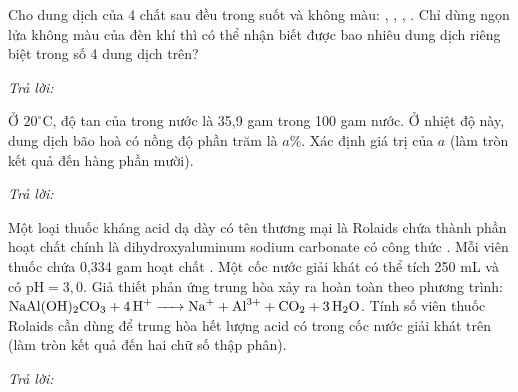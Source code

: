 \documentclass[11pt,a4paper]{article}
\def\loigiai#1{}
\begin{document}
\begin{ex}
Cho dung dịch của 4 chất sau đều trong suốt và không màu: , , , . Chỉ dùng ngọn lửa không màu của đèn khí thì có thể nhận biết được bao nhiêu dung dịch riêng biệt trong số 4 dung dịch trên?
\par\noindent\textit{Trả lời:} \dotfill
\loigiai{}
\end{ex}

\begin{ex}
Ở $20^\circ\text{C}$, độ tan của  trong nước là 35,9 gam trong 100 gam nước. Ở nhiệt độ này, dung dịch  bão hoà có nồng độ phần trăm là $a\%$. Xác định giá trị của $a$ (làm tròn kết quả đến hàng phần mười).
\par\noindent\textit{Trả lời:} \dotfill
\loigiai{}
\end{ex}

\begin{ex}
Một loại thuốc kháng acid dạ dày có tên thương mại là Rolaids chứa thành phần hoạt chất chính là dihydroxyaluminum sodium carbonate có công thức . Mỗi viên thuốc chứa 0,334 gam hoạt chất . Một cốc nước giải khát có thể tích 250 mL và có $\text{pH} = 3{,}0$. Giả thiết phản ứng trung hòa xảy ra hoàn toàn theo phương trình: $\ce{NaAl(OH)2CO3 + 4H+ -> Na+ + Al^3+ + CO2 + 3H2O}$. Tính số viên thuốc Rolaids cần dùng để trung hòa hết lượng acid có trong cốc nước giải khát trên (làm tròn kết quả đến hai chữ số thập phân).
\par\noindent\textit{Trả lời:} \dotfill
\loigiai{}
\end{ex}

\end{document}
